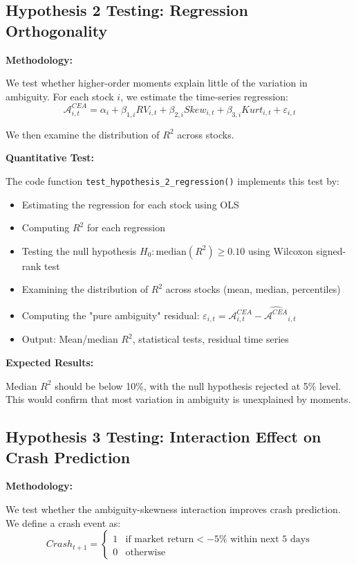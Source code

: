 \documentclass[preprint,12pt,authoryear]{elsarticle}
\begin{document}
\subsection{Hypothesis 2 Testing: Regression Orthogonality}

\noindent
\textbf{Methodology:}

We test whether higher-order moments explain little of the variation in ambiguity. For each stock $i$, we estimate the time-series regression:
\begin{equation}
\mathcal{A}^{CEA}_{i,t} = \alpha_i + \beta_{1,i} RV_{i,t} + \beta_{2,i} Skew_{i,t} + \beta_{3,i} Kurt_{i,t} + \varepsilon_{i,t}
\end{equation}

We then examine the distribution of $R^2$ across stocks.

\noindent
\textbf{Quantitative Test:}

The code function \texttt{test\_hypothesis\_2\_regression()} implements this test by:
\begin{itemize}
\item Estimating the regression for each stock using OLS
\item Computing $R^2$ for each regression
\item Testing the null hypothesis $H_0: \text{median}(R^2) \geq 0.10$ using Wilcoxon signed-rank test
\item Examining the distribution of $R^2$ across stocks (mean, median, percentiles)
\item Computing the "pure ambiguity" residual: $\varepsilon_{i,t} = \mathcal{A}^{CEA}_{i,t} - \widehat{\mathcal{A}^{CEA}}_{i,t}$
\item Output: Mean/median $R^2$, statistical tests, residual time series
\end{itemize}

\noindent
\textbf{Expected Results:}

Median $R^2$ should be below 10\%, with the null hypothesis rejected at 5\% level. This would confirm that most variation in ambiguity is unexplained by moments.

\subsection{Hypothesis 3 Testing: Interaction Effect on Crash Prediction}

\noindent
\textbf{Methodology:}

We test whether the ambiguity-skewness interaction improves crash prediction. We define a crash event as:
\begin{equation}
Crash_{t+1} = \begin{cases}
1 & \text{if market return} < -5\% \text{ within next } 5 \text{ days} \\
0 & \text{otherwise}
\end{cases}
\end{equation}
\end{document}
